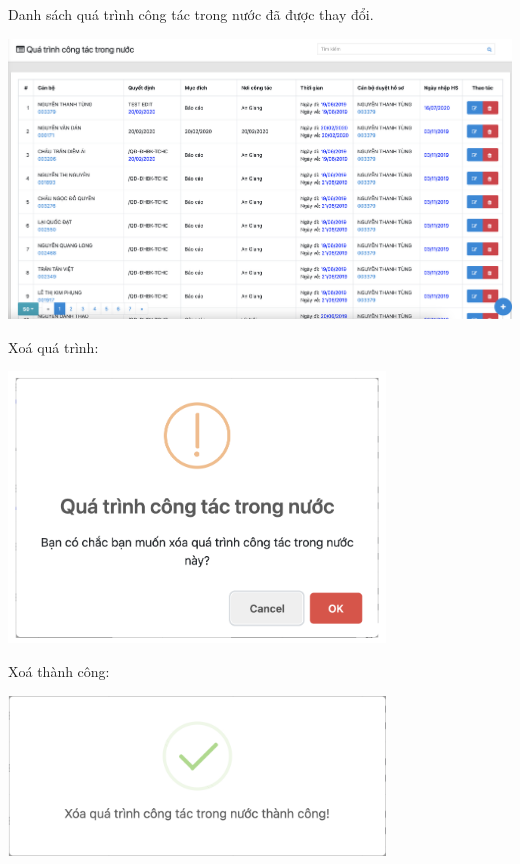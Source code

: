 Danh sách quá trình công tác trong nước đã được thay đổi.
\begin{center}
  \captionsetup{type=figure}
  \includegraphics[width=15cm]{img/test/viewEdit.png}
\end{center}
Xoá quá trình:
\begin{center}
  \captionsetup{type=figure}
  \includegraphics[width=10cm]{img/test/confirmDelete.png}
\end{center}
\newpage
\noindent Xoá thành công:
\begin{center}
  \captionsetup{type=figure}
  \includegraphics[width=10cm]{img/test/aleartDelete.png}
\end{center}
